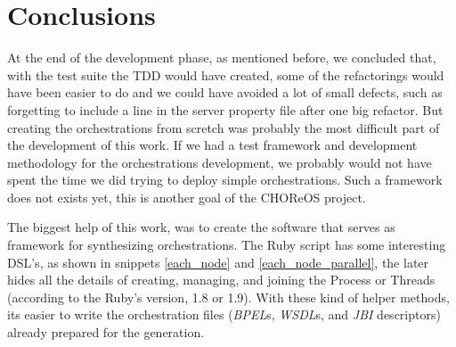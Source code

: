\section{Conclusions}


At the end of the development phase, as mentioned before, we concluded that, with the test suite the TDD would have created, some of the refactorings would have been easier to do and we could have avoided a lot of small defects, such as forgetting to include a line in the server property file after one big refactor. But creating the orchestrations from scretch was probably the most difficult part of the development of this work. If we had a test framework and development methodology for the orchestrations development, we probably would not have spent the time we did trying to deploy simple orchestrations. Such a framework does not exists yet, this is another goal of the CHOReOS project.

The biggest help of this work, was to create the software that serves as framework for synthesizing orchestrations. The Ruby script has some interesting DSL's, as shown in snippets \ref{each_node} and  \ref{each_node_parallel}, the later hides all the details of creating, managing, and joining the Process or Threads (according to the Ruby's version, 1.8 or 1.9). With these kind of helper methods, its easier to write the orchestration files (\emph{BPEL}s, \emph{WSDL}s, and \emph{JBI} descriptors) already prepared for the generation.




